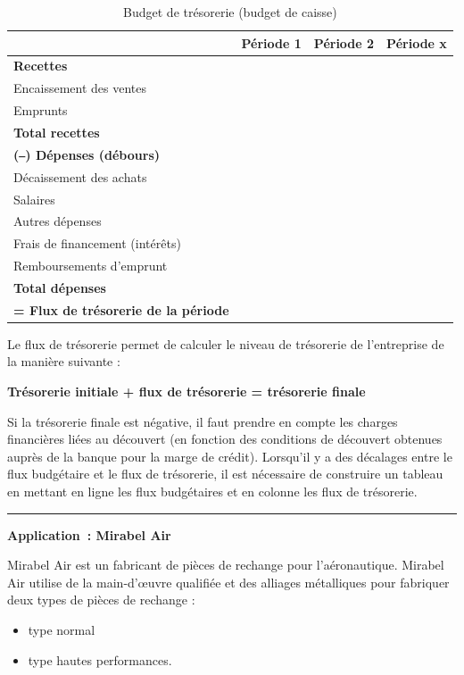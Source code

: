 \documentclass[oneside]{kaobook}
\begin{document}
\begin{table}[htbp]
\caption{Budget de trésorerie (budget de caisse)}
\centering
\sidenotesize
\begin{tabular}{llll}
 & Période 1 & Période 2 & Période x\\
\hline
\textbf{Recettes} &  &  & \\
Encaissement des ventes &  &  & \\
Emprunts &  &  & \\
\textbf{Total recettes} &  &  & \\
\textbf{(‒) Dépenses (débours)} &  &  & \\
Décaissement des achats &  &  & \\
Salaires &  &  & \\
Autres dépenses &  &  & \\
Frais de financement (intérêts) &  &  & \\
Remboursements d’emprunt &  &  & \\
\textbf{Total dépenses} &  &  & \\
\textbf{= Flux de trésorerie de la période} &  &  & \\
\end{tabular}
\end{table}


Le flux de trésorerie permet de calculer le niveau de trésorerie de l'entreprise de la manière suivante : 
\begin{center}
\textbf{Trésorerie initiale + flux de trésorerie = trésorerie finale}
\end{center}
Si la trésorerie finale est négative, il faut prendre en compte les charges financières liées au découvert (en fonction des conditions de découvert obtenues auprès de la banque pour la marge de crédit). 
Lorsqu'il y a des décalages entre le flux budgétaire et le flux de trésorerie, il est nécessaire de construire un tableau en mettant en ligne les flux budgétaires et en colonne les flux de trésorerie.

\noindent\rule{\textwidth}{0.5pt}
\textbf{Application : Mirabel Air}

Mirabel Air est un fabricant de pièces de rechange pour l’aéronautique. Mirabel Air utilise de la main-d’œuvre qualifiée et des alliages métalliques pour fabriquer deux types de pièces de rechange :
\begin{itemize}
\item type normal
\item type hautes performances.
\end{itemize}
\end{document}
